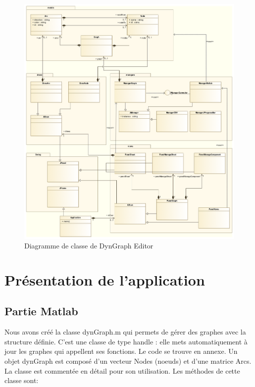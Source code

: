 \documentclass[pidr]{tnreport}
\begin{document}
\begin{figure}[h]
  \centering
  \includegraphics[width=17cm]{figures/dc_1}
  \caption{Diagramme de classe de DynGraph Editor}
  \label{fig:dc_1}
\end{figure}

\clearpage

\section{Présentation de l'application}

\subsection{Partie Matlab}

Nous avons créé la classe dynGraph.m qui permets de gérer des graphes avec la structure définie. C’est une classe de type handle : elle mets automatiquement à jour les graphes qui appellent ses fonctions. 
Le code se trouve en annexe.
Un objet dynGraph est composé d’un vecteur Nodes (noeuds) et d’une matrice Arcs.
La classe est commentée en détail pour son utilisation.
Les méthodes de cette classe sont:
\end{document}
